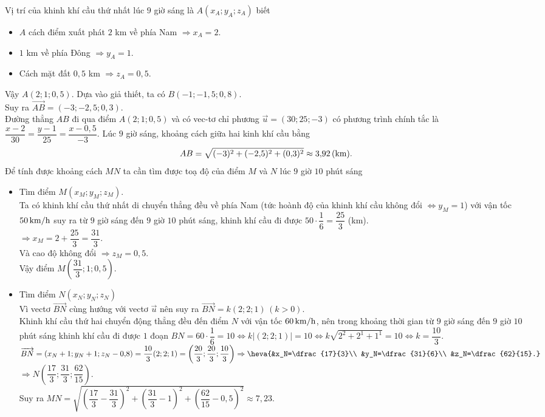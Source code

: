 \begin{ex}
{\begin{itemchoice}
			\itemch Vị trí của khinh khí cầu thứ nhất lúc $9$ giờ sáng là $A(x_A;y_A;z_A)$ biết
			\begin{itemize}
				\item $A$ cách điểm xuất phát $2$ km về phía Nam $ \Rightarrow x_A=2$.
				\item $1$ km về phía Đông $ \Rightarrow y_A=1$.
				\item Cách mặt đất $0{,}5$ km $ \Rightarrow z_A=0{,}5$.
			\end{itemize}
		Vậy $A(2;1;0{,}5)$.
			\itemch Dựa vào giả thiết, ta có $B(-1;-1{,}5;0{,}8)$.\\
			Suy ra $\overrightarrow{AB}=(-3;-2{,}5;0{,3})$.\\
			Đường thẳng $AB$ đi qua điểm $A(2;1;0{,}5)$ và có vec-tơ chỉ phương $\overrightarrow{u}=(30;25;-3)$ có phương trình chính tắc là $\dfrac{x-2}{30}=\dfrac{y-1}{25}=\dfrac{x-0{,}5}{-3}$.
			\itemch Lúc $9$ giờ sáng, khoảng cách giữa hai kinh khí cầu bằng $$AB=\sqrt{(-3)^2+(-2{,}5)^2+(0{,}3)^2}\approx3{,}92\, (\rm km).$$
			\itemch Để tính được khoảng cách $MN$ ta cần tìm được toạ độ của điểm $M$ và $N$ lúc $9$ giờ $10$ phút sáng
			\begin{itemize}
				\item Tìm điểm $M(x_M;y_M;z_M)$.\\
				Ta có khinh khí cầu thứ nhất di chuyển thẳng đều về phía Nam (tức hoành độ của khinh khí cầu không đổi $ \Leftrightarrow y_M=1$) với vận tốc $50\,\rm km/h$ suy ra từ $9$ giờ sáng đến $9$ giờ $10$ phút sáng, khinh khí cầu đi được $50\cdot\dfrac{1}{6}=\dfrac{25}{3}$ (km).\\
				$ \Rightarrow x_M=2+\dfrac{25}{3}=\dfrac{31}{3}$.\\
				Và cao độ không đổi $ \Rightarrow z_M=0{,}5$.\\
				Vậy điểm $M(\dfrac{31}{3};1;0{,}5)$.
				\item Tìm điểm $N(x_N;y_N;z_N)$\\
				Vì vectơ $\overrightarrow{BN}$ cùng hướng với vectơ $\overrightarrow{u}$ nên suy ra $\overrightarrow{BN}=k(2;2;1)\, (k>0)$.\\
				Khinh khí cầu thứ hai chuyển động thẳng đều đến điểm $N$ với vận tốc $60\, \rm km/h$, nên trong khoảng thời gian từ $9$ giờ sáng đến $9$ giờ $10$ phút sáng khinh khí cầu đi được $1$ đoạn $BN=60\cdot\dfrac{1}{6}=10 \Leftrightarrow k|(2;2;1)|=10 \Leftrightarrow k\sqrt{2^2+2^1+1^1}=10 \Leftrightarrow k=\dfrac{10}{3}$.\\
				$\overrightarrow{BN}=\left(x_N+1;y_N+1;z_N-0{,}8\right) =\dfrac{10}{3}(2;2;1) =\left(\dfrac{20}{3};\dfrac{20}{3};\dfrac{10}{3}\right) \Rightarrow \heva{&x_N=\dfrac{17}{3}\\ &y_N=\dfrac{31}{6}\\ &z_N=\dfrac{62}{15}.}$\\
				$ \Rightarrow N\left(\dfrac{17}{3};\dfrac{31}{3};\dfrac{62}{15}\right)$.\\
				Suy ra $MN=\sqrt{\left(\dfrac{17}{3}-\dfrac{31}{3}\right)^2+\left(\dfrac{31}{3}-1\right)^2+\left(\dfrac{62}{15}-0{,}5\right)^2} \approx 7{,}23$.
			\end{itemize}
		\end{itemchoice}
	}
\end{ex}

